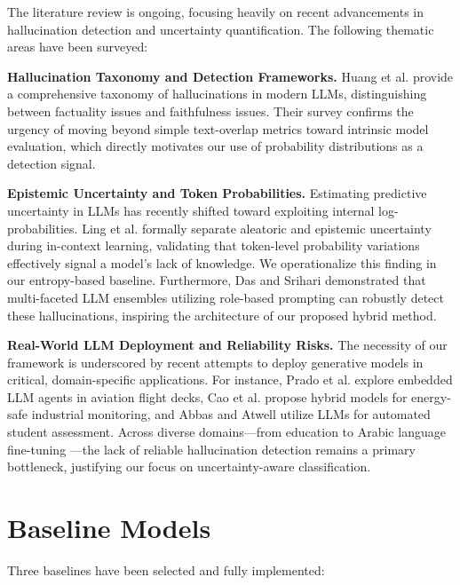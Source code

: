 \documentclass[12pt,a4paper]{article}
\begin{document}
The literature review is ongoing, focusing heavily on recent advancements in hallucination detection and uncertainty quantification. The following thematic areas have been surveyed:

\textbf{Hallucination Taxonomy and Detection Frameworks.}
Huang et al. \cite{huang2025survey} provide a comprehensive taxonomy of hallucinations in modern LLMs, distinguishing between factuality issues and faithfulness issues. Their survey confirms the urgency of moving beyond simple text-overlap metrics toward intrinsic model evaluation, which directly motivates our use of probability distributions as a detection signal.

\textbf{Epistemic Uncertainty and Token Probabilities.}
Estimating predictive uncertainty in LLMs has recently shifted toward exploiting internal log-probabilities. Ling et al. \cite{ling2024uncertainty} formally separate aleatoric and epistemic uncertainty during in-context learning, validating that token-level probability variations effectively signal a model's lack of knowledge. We operationalize this finding in our entropy-based baseline. Furthermore, Das and Srihari \cite{das2024compos} demonstrated that multi-faceted LLM ensembles utilizing role-based prompting can robustly detect these hallucinations, inspiring the architecture of our proposed hybrid method.

\textbf{Real-World LLM Deployment and Reliability Risks.}
The necessity of our framework is underscored by recent attempts to deploy generative models in critical, domain-specific applications. For instance, Prado et al. \cite{prado2025enhancing} explore embedded LLM agents in aviation flight decks, Cao et al. \cite{cao2025toward} propose hybrid models for energy-safe industrial monitoring, and Abbas and Atwell \cite{abbas2025cognitive} utilize LLMs for automated student assessment. Across diverse domains—from education to Arabic language fine-tuning \cite{khader2025adapting}—the lack of reliable hallucination detection remains a primary bottleneck, justifying our focus on uncertainty-aware classification.

\section{Baseline Models}

Three baselines have been selected and fully implemented:
\end{document}
